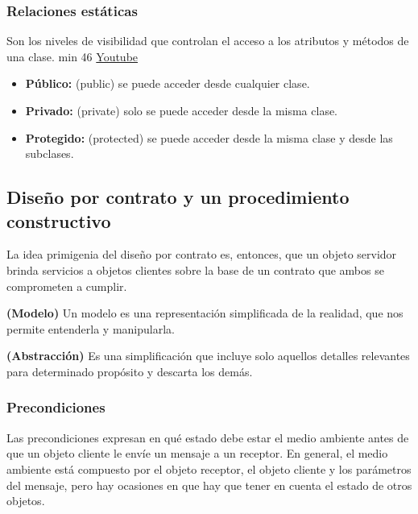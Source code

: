 \documentclass[../main.tex]{subfiles}
\begin{document}
        \subsubsection{Relaciones estáticas}
            Son los niveles de visibilidad que controlan el acceso a los atributos y métodos de una clase. min 46 \href{https://www.youtube.com/watch?v=Zw3d8AwMykk&list=PLR0NFKZIjBcCQXgJYWVQEyjrbfkcZq-iP&index=2}{Youtube}
            \begin{itemize}
                \item \textbf{Público:} (public) se puede acceder desde cualquier clase.
                \item \textbf{Privado:} (private) solo se puede acceder desde la misma clase.
                \item \textbf{Protegido:} (protected) se puede acceder desde la misma clase y desde las subclases.
            \end{itemize}

    \subsection{Diseño por contrato y un procedimiento constructivo}
        La idea primigenia del diseño por contrato es, entonces, que un objeto servidor brinda servicios a objetos clientes sobre la base de un contrato que ambos se comprometen a cumplir.

        \begin{definition} \textbf{(Modelo)}
            Un modelo es una representación simplificada de la realidad, que nos permite entenderla y manipularla.
        \end{definition}

        \begin{definition} \textbf{(Abstracción)}
            Es una simplificación que incluye solo aquellos detalles relevantes para determinado propósito y descarta los demás.
        \end{definition}

        \subsubsection{Precondiciones}
            Las precondiciones expresan en qué estado debe estar el medio ambiente antes de que un objeto cliente le envíe un mensaje a un receptor. En general, el medio ambiente está compuesto por el objeto receptor, el objeto cliente y los parámetros del mensaje, pero hay ocasiones en que hay que tener en cuenta el estado de otros objetos.
\end{document}
